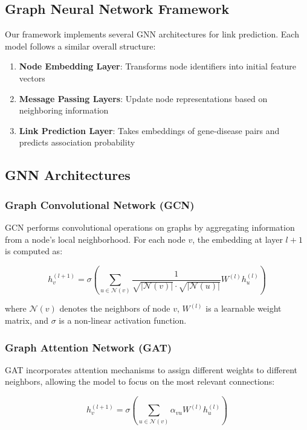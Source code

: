 \documentclass[conference]{IEEEtran}
\begin{document}
\subsection{Graph Neural Network Framework}
Our framework implements several GNN architectures for link prediction. Each model follows a similar overall structure:
\begin{enumerate}
\item \textbf{Node Embedding Layer}: Transforms node identifiers into initial feature vectors
\item \textbf{Message Passing Layers}: Update node representations based on neighboring information
\item \textbf{Link Prediction Layer}: Takes embeddings of gene-disease pairs and predicts association probability
\end{enumerate}

\subsection{GNN Architectures}
\subsubsection{Graph Convolutional Network (GCN)}
GCN performs convolutional operations on graphs by aggregating information from a node's local neighborhood. For each node $v$, the embedding at layer $l+1$ is computed as:

\begin{equation}
h_v^{(l+1)} = \sigma\left(\sum_{u \in \mathcal{N}(v)} \frac{1}{\sqrt{|\mathcal{N}(v)|} \cdot \sqrt{|\mathcal{N}(u)|}} W^{(l)} h_u^{(l)}\right)
\end{equation}

where $\mathcal{N}(v)$ denotes the neighbors of node $v$, $W^{(l)}$ is a learnable weight matrix, and $\sigma$ is a non-linear activation function.

\subsubsection{Graph Attention Network (GAT)}
GAT incorporates attention mechanisms to assign different weights to different neighbors, allowing the model to focus on the most relevant connections:

\begin{equation}
h_v^{(l+1)} = \sigma\left(\sum_{u \in \mathcal{N}(v)} \alpha_{vu} W^{(l)} h_u^{(l)}\right)
\end{equation}
\end{document}
